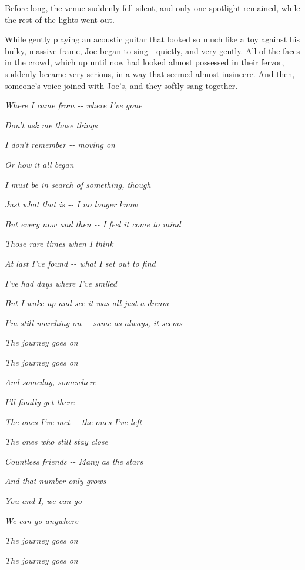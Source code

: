 \documentclass[
]{article}
\begin{document}
Before long, the venue suddenly fell silent, and only one spotlight
remained, while the rest of the lights went out.

While gently playing an acoustic guitar that looked so much like a toy
against his bulky, massive frame, Joe began to sing - quietly, and very
gently. All of the faces in the crowd, which up until now had looked
almost possessed in their fervor, suddenly became very serious, in a way
that seemed almost insincere. And then, someone's voice joined with
Joe's, and they softly sang together.

\emph{Where I came from -\/- where I've gone}

\emph{Don't ask me those things}

\emph{I don't remember -\/- moving on}

\emph{Or how it all began}

\emph{I must be in search of something, though}

\emph{Just what that is -\/- I no longer know}

\emph{}

\emph{But every now and then -\/- I feel it come to mind}

\emph{Those rare times when I think}

\emph{At last I've found -\/- what I set out to find}

\emph{I've had days where I've smiled}

\emph{But I wake up and see it was all just a dream}

\emph{I'm still marching on -\/- same as always, it seems}

\emph{}

\emph{The journey goes on}

\emph{The journey goes on}

\emph{And someday, somewhere}

\emph{I'll finally get there}

\emph{The ones I've met -\/- the ones I've left}

\emph{The ones who still stay close}

\emph{Countless friends -\/- Many as the stars}

\emph{And that number only grows}

\emph{You and I, we can go}

\emph{We can go anywhere}

\emph{}

\emph{The journey goes on}

\emph{The journey goes on}
\end{document}
